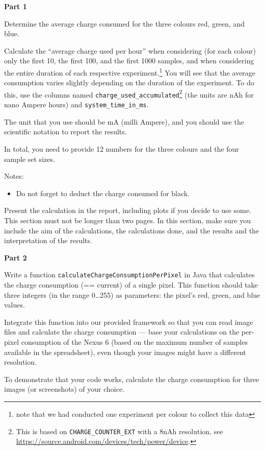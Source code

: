 \documentclass{pracs}
\begin{document}
\noindent\textbf{Part 1}

Determine the average charge consumed for the three colours red, green, and blue. 

Calculate the ``average charge used per hour'' when considering (for each colour) only the first 10, the first 100, and the first 1000 samples, and when considering the entire duration of each respective experiment.\footnote{note that we had conducted one experiment per colour to collect this data} 
You will see that the average consumption varies slightly depending on the duration of the experiment. To do this, use the columns named \texttt{charge\_used\_accumulated}\footnote{This is based on \texttt{CHARGE\_COUNTER\_EXT} with a 8nAh resolution, see \url{https://source.android.com/devices/tech/power/device}.} (the units are nAh for nano Ampere hours) and \texttt{system\_time\_in\_ms}. 

The unit that you use should be mA (milli Ampere), and you should use the scientific notation to report the results.

In total, you need to provide 12 numbers for the three colours and the four sample set sizes.

Notes:
\begin{itemize}
\item Do not forget to deduct the charge consumed for black.
\end{itemize}

Present the calculation in the report, including plots if you decide to use some. This section must not be longer than two pages. In this section, make sure you include the aim of the calculations, the calculations done, and the results and the interpretation of the results.

\noindent\textbf{Part 2}

Write a function \texttt{calculateChargeConsumptionPerPixel} in Java that calculates the charge consumption (== current) of a single pixel. This function should take three integers (in the range 0\ldots255) as parameters: the pixel's red, green, and blue values.

Integrate this function into our provided framework so that you can read image files and calculate the charge consumption --- base your calculations on the per-pixel consumption of the Nexus 6 (based on the maximum number of samples available in the spreadsheet), even though your images might have a different resolution. 

To demonstrate that your code works, calculate the charge consumption for three images (or screenshots) of your choice. 
\end{document}
